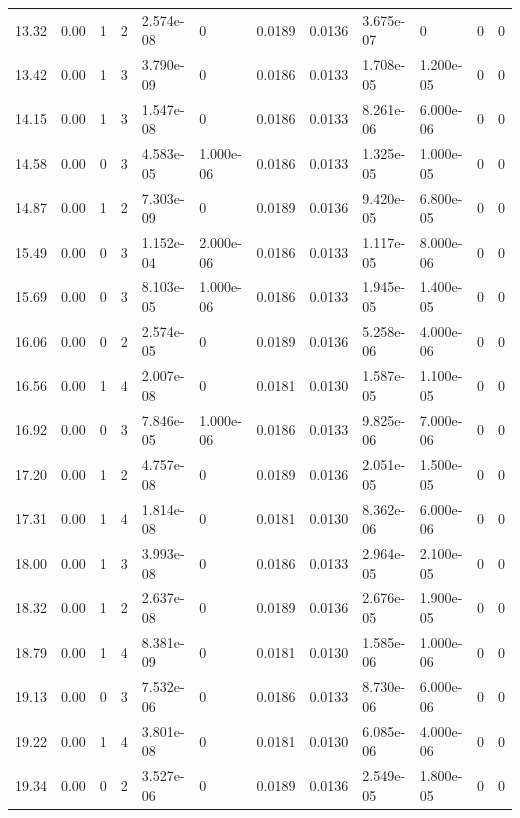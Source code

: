 \documentclass[preview]{standalone}
\begin{document}
{{{\begin{tabular}{L{1.2cm}C{1.2cm} C{0.3cm}C{0.5cm} C{1.4cm}C{1.4cm} C{1.4cm}C{1.4cm} C{1.6cm}C{1.6cm} C{1.6cm}C{1.6cm}}
  13.32  &  0.00  & 1     &  2 &  2.574e-08  & 0  &  0.0189&   0.0136& 3.675e-07 & 0   &  0 & 0  \\ 
  13.42  &  0.00  & 1     &  3 &  3.790e-09  & 0  &  0.0186&   0.0133& 1.708e-05 & 1.200e-05   &  0 & 0  \\ 
  14.15  &  0.00  & 1     &  3 &  1.547e-08  & 0  &  0.0186&   0.0133& 8.261e-06 & 6.000e-06   &  0 & 0  \\ 
  14.58  &  0.00  & 0     &  3 &  4.583e-05  & 1.000e-06  &  0.0186&   0.0133& 1.325e-05 & 1.000e-05   &  0 & 0  \\ 
  14.87  &  0.00  & 1     &  2 &  7.303e-09  & 0  &  0.0189&   0.0136& 9.420e-05 & 6.800e-05   &  0 & 0  \\ 
  15.49  &  0.00  & 0     &  3 &  1.152e-04  & 2.000e-06  &  0.0186&   0.0133& 1.117e-05 & 8.000e-06   &  0 & 0  \\ 
  15.69  &  0.00  & 0     &  3 &  8.103e-05  & 1.000e-06  &  0.0186&   0.0133& 1.945e-05 & 1.400e-05   &  0 & 0  \\ 
  16.06  &  0.00  & 0     &  2 &  2.574e-05  & 0  &  0.0189&   0.0136& 5.258e-06 & 4.000e-06   &  0 & 0  \\ 
  16.56  &  0.00  & 1     &  4 &  2.007e-08  & 0  &  0.0181&   0.0130& 1.587e-05 & 1.100e-05   &  0 & 0  \\ 
  16.92  &  0.00  & 0     &  3 &  7.846e-05  & 1.000e-06  &  0.0186&   0.0133& 9.825e-06 & 7.000e-06   &  0 & 0  \\ 
  17.20  &  0.00  & 1     &  2 &  4.757e-08  & 0  &  0.0189&   0.0136& 2.051e-05 & 1.500e-05   &  0 & 0  \\ 
  17.31  &  0.00  & 1     &  4 &  1.814e-08  & 0  &  0.0181&   0.0130& 8.362e-06 & 6.000e-06   &  0 & 0  \\ 
  18.00  &  0.00  & 1     &  3 &  3.993e-08  & 0  &  0.0186&   0.0133& 2.964e-05 & 2.100e-05   &  0 & 0  \\ 
  18.32  &  0.00  & 1     &  2 &  2.637e-08  & 0  &  0.0189&   0.0136& 2.676e-05 & 1.900e-05   &  0 & 0  \\ 
  18.79  &  0.00  & 1     &  4 &  8.381e-09  & 0  &  0.0181&   0.0130& 1.585e-06 & 1.000e-06   &  0 & 0  \\ 
  19.13  &  0.00  & 0     &  3 &  7.532e-06  & 0  &  0.0186&   0.0133& 8.730e-06 & 6.000e-06   &  0 & 0  \\ 
  19.22  &  0.00  & 1     &  4 &  3.801e-08  & 0  &  0.0181&   0.0130& 6.085e-06 & 4.000e-06   &  0 & 0  \\ 
  19.34  &  0.00  & 0     &  2 &  3.527e-06  & 0  &  0.0189&   0.0136& 2.549e-05 & 1.800e-05   &  0 & 0  \\ 

\end{tabular}}}}
\end{document}
